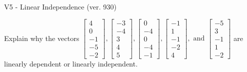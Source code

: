 \begin{exercise}
  \begin{exerciseTitle}V5 - Linear Independence (ver. 930)\end{exerciseTitle}
  \begin{exerciseStatement}
    Explain why the vectors \(\left[\begin{array}{r}
4 \\
0 \\
-1 \\
-5 \\
-2
\end{array}\right] , \left[\begin{array}{r}
-3 \\
-4 \\
3 \\
4 \\
5
\end{array}\right] , \left[\begin{array}{r}
0 \\
-4 \\
0 \\
-4 \\
-1
\end{array}\right] , \left[\begin{array}{r}
-1 \\
1 \\
-1 \\
-2 \\
4
\end{array}\right] , \text{ and } \left[\begin{array}{r}
-5 \\
3 \\
-1 \\
1 \\
-2
\end{array}\right]\) are linearly dependent or linearly independent.	



\end{exerciseStatement}
\end{exercise}
